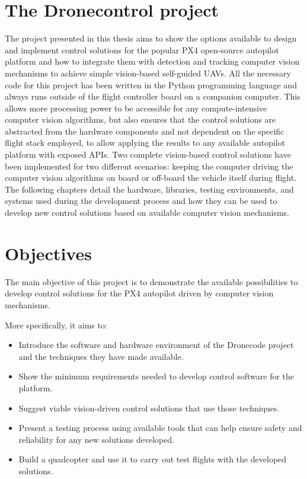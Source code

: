 \section{The Dronecontrol project}

The project presented in this thesis aims to show the options available to design and implement control solutions for the popular PX4 open-source autopilot platform and how to integrate them with detection and tracking computer vision mechanisms to achieve simple vision-based self-guided UAVs.
All the necessary code for this project has been written in the Python programming language and always runs outside of the flight controller board on a companion computer.
This allows more processing power to be accessible for any compute-intensive computer vision algorithms,
but also ensures that the control solutions are abstracted from the hardware components and not dependent on the specific flight stack employed, 
to allow applying the results to any available autopilot platform with exposed APIs.
Two complete vision-based control solutions have been implemented for two different scenarios: keeping the computer driving the computer vision algorithms on board or off-board the vehicle itself during flight.
The following chapters detail the hardware, libraries, testing environments, and systems used during the development process and how they can be used to develop new control solutions based on available computer vision mechanisms.



\section{Objectives}
\label{sec:objetives}

The main objective of this project is to demonstrate the available possibilities to develop control solutions for the PX4 autopilot driven by computer vision mechanisms.

More specifically, it aims to:
\begin{itemize}
    \item Introduce the software and hardware environment of the Dronecode project and the techniques they have made available.
    \item Show the minimum requirements needed to develop control software for the platform.
    \item Suggest viable vision-driven control solutions that use those techniques.
    \item Present a testing process using available tools that can help ensure safety and reliability for any new solutions developed.
    \item Build a quadcopter and use it to carry out test flights with the developed solutions.
\end{itemize}


